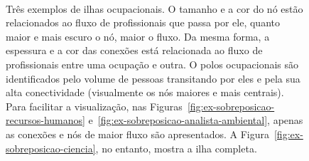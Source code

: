 \documentclass[12pt,a4paper]{article}
\begin{document}
\begin{figure}[ht]
    \centering
    \\    
    \caption{Três exemplos de ilhas ocupacionais. O tamanho e a cor do nó estão relacionados ao fluxo de profissionais que passa por ele, quanto maior e mais escuro o nó, maior o fluxo. Da mesma forma, a espessura e a cor das conexões está relacionada ao fluxo de profissionais entre uma ocupação e outra. O polos ocupacionais são identificados pelo volume de pessoas transitando por eles e pela sua alta conectividade (visualmente os nós maiores e mais centrais). Para facilitar a visualização, nas Figuras~\ref{fig:ex-sobreposicao-recursos-humanos} e~\ref{fig:ex-sobreposicao-analista-ambiental}, apenas as conexões e nós de maior fluxo são apresentados. A Figura~\ref{fig:ex-sobreposicao-ciencia}, no entanto, mostra a ilha completa.}
    \label{fig:ex-ilhas-ocupacionais}
\end{figure}
\end{document}

